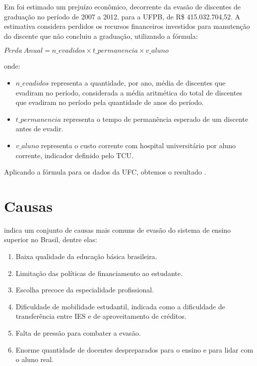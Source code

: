 Em \cite{evasao_global} foi estimado um prejuízo econômico, decorrente da evasão de discentes de graduação no período de 2007 a 2012, para a UFPB, de R\$ 415.032.704,52. A estimativa considera perdidos os recursos financeiros investidos para manutenção do discente que não concluiu a graduação, utilizando a fórmula:

$Perda\ Anual=n\_evadidos \times t\_permanencia \times v\_aluno$

onde:
\begin{itemize}
\item $n\_evadidos$ representa a quantidade, por ano, média de discentes que evadiram no período, considerada a média aritmética do total de discentes que evadiram no período pela quantidade de anos do período.
\item $t\_permanencia$ representa o tempo de permanência esperado de um discente antes de evadir.
\item $v\_aluno$ representa o custo corrente com hospital universitário por aluno corrente, indicador definido pelo TCU\cite{indicadores_TCU}.
\end{itemize}

Aplicando a fórmula para os dados da UFC, obtemos o resultado .

\section{Causas}

\cite{evasao_panorama2} indica um conjunto de causas mais comuns de evasão do sistema de ensino superior no Brasil, dentre elas:

\begin{enumerate}

\item Baixa qualidade da educação básica brasileira.

\item Limitação das políticas de financiamento ao estudante.

\item Escolha precoce da especialidade profissional.

\item Dificuldade de mobilidade estudantil, indicada como a dificuldade de transferência entre IES e de aproveitamento de créditos.

\item Falta de pressão para combater a evasão.

\item Enorme quantidade de docentes despreparados para o ensino e para lidar com o aluno real.

\end{enumerate}

